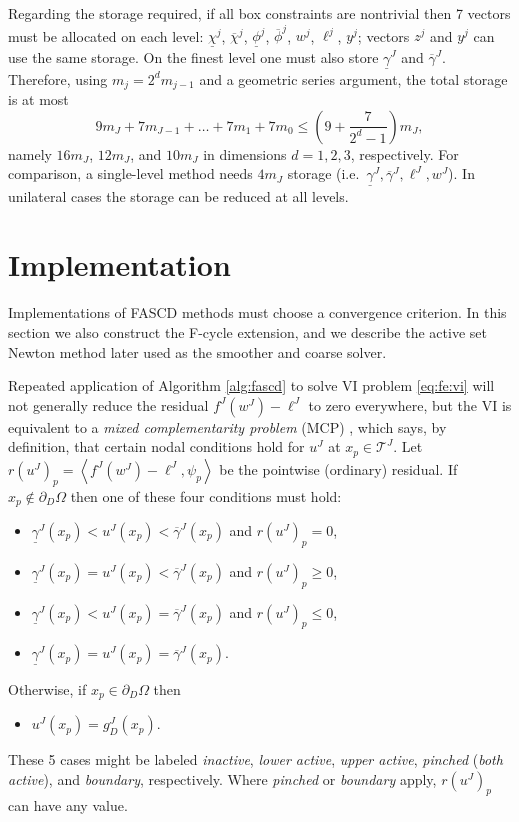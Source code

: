 \documentclass[review,hidelinks,onefignum,onetabnum]{siamart220329}
\newcommand{\ip}[2]{\left<#1,#2\right>}
\begin{document}
Regarding the storage required, if all box constraints are nontrivial then 7 vectors must be allocated on each level: $\underline{\chi}^j$, $\overline{\chi}^j$, $\underline{\phi}^j$, $\overline{\phi}^j$, $w^j$, $\ell^j$, $y^j$; vectors $z^j$ and $y^j$ can use the same storage.  On the finest level one must also store $\underline{\gamma}^J$ and $\overline{\gamma}^J$.  Therefore, using $m_j=2^d m_{j-1}$ and a geometric series argument, the total storage is at most
\begin{equation}
9 m_J + 7 m_{J-1} + \dots + 7 m_1 + 7 m_0 \le \left(9 + \frac{7}{2^d - 1}\right) m_J,
\end{equation}
namely $16m_J$, $12m_J$, and $10m_J$ in dimensions $d=1,2,3$, respectively.  For comparison, a single-level method needs $4 m_J$ storage (i.e.~$\underline{\gamma}^J,\overline{\gamma}^J,\ell^J,w^J$).  In unilateral cases the storage can be reduced at all levels.


\section{Implementation} \label{sec:implementation}

Implementations of FASCD methods must choose a convergence criterion.  In this section we also construct the F-cycle extension, and we describe the active set Newton method later used as the smoother and coarse solver.

Repeated application of Algorithm \ref{alg:fascd} to solve VI problem \eqref{eq:fe:vi} will not generally reduce the residual $f^J(w^J) - \ell^J$ to zero everywhere, but the VI is equivalent to a \emph{mixed complementarity problem} (MCP) \cite{FacchineiPang2003}, which says, by definition, that certain nodal conditions hold for $u^J$ at $x_p \in \mathcal{T}^J$.  Let $r(u^J)_p = \ip{f^J(w^J)-\ell^J}{\psi_p}$ be the pointwise (ordinary) residual.  If $x_p \notin \partial_D\Omega$ then one of these four conditions must hold:
\begin{itemize}
\item $\underline{\gamma}^J(x_p)<u^J(x_p)<\overline{\gamma}^J(x_p)$ and $r(u^J)_p = 0$,
\item $\underline{\gamma}^J(x_p)=u^J(x_p)<\overline{\gamma}^J(x_p)$ and $r(u^J)_p \ge 0$,
\item $\underline{\gamma}^J(x_p)<u^J(x_p)=\overline{\gamma}^J(x_p)$ and $r(u^J)_p \le 0$,
\item $\underline{\gamma}^J(x_p)=u^J(x_p)=\overline{\gamma}^J(x_p)$.
\end{itemize}
Otherwise, if $x_p \in \partial_D\Omega$ then
\begin{itemize}
\item $u^J(x_p)=g_D^J(x_p)$.
\end{itemize}
These 5 cases might be labeled \emph{inactive}, \emph{lower active}, \emph{upper active}, \emph{pinched} (\emph{both active}), and \emph{boundary}, respectively.  Where \emph{pinched} or \emph{boundary} apply, $r(u^J)_p$ can have any value.
\end{document}
